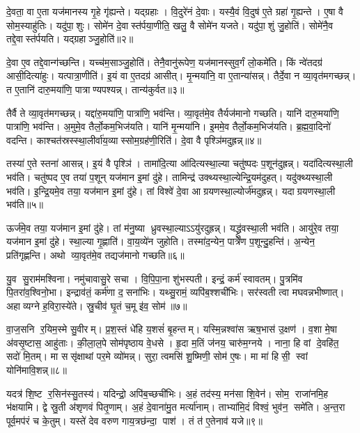 दे॒वता॒ वा ए॒ता यज॑मानस्य गृ॒हे गृ॑ह्यन्ते। यद्ग्रहाः। वि॒दुरे॑नं दे॒वाः। यस्यै॒वं वि॒दुष॑ ए॒ते ग्रहा॑ गृ॒ह्यन्ते। ए॒षा वै सोम॒स्याहु॑तिः। यदु॑पा॒शुः। सोमे॑न दे॒वास्त॑र्पया॒णीति॒ खलु॒ वै सोमे॑न यजते। यदु॑पा॒शुं जु॒होति॑। सोमे॑नै॒व तद्दे॒वास्त॑र्पयति। यद्ग्रहाञ्जु॒होति॑॥२॥

दे॒वा ए॒व तद्दे॒वान्ग॑च्छन्ति। यच्च॑म॒साञ्जु॒होति॑। तेनै॒वानु॑रूपेण॒ यज॑मानस्सुव॒र्गं लो॒कमे॑ति। किं न्वे॑तदग्र॑ आसी॒दित्या॑हुः। यत्पात्रा॒णीति॑। इ॒यं वा ए॒तदग्र॑ आसीत्। मृ॒न्मया॑नि॒ वा ए॒तान्या॑सन्न्। तैर्दे॒वा न व्या॒वृत॑मगच्छन्न्। त ए॒तानि॑ दारु॒मया॑णि॒ पात्राण्यपश्यन्न्। तान्य॑कुर्वत॥३॥

तैर्वै ते व्या॒वृत॑मगच्छन्न्। यद्दा॑रु॒मया॑णि॒ पात्रा॑णि॒ भव॑न्ति। व्या॒वृत॑मे॒व तैर्यज॑मानो गच्छति। यानि॑ दारु॒मया॑णि॒ पात्रा॑णि॒ भव॑न्ति। अ॒मुमे॒व तैर्लो॒कम॒भिज॑यति। यानि॑ मृ॒न्मया॑नि। इ॒ममे॒व तैर्लो॒कम॒भिज॑यति। ब्र॒ह्म॒वा॒दिनो॑ वदन्ति। काश्चत॑स्रस्स्था॒लीर्वा॑य॒व्यास्सोम॒ग्रह॑णी॒रिति॑। दे॒वा वै पृश्ञि॑मदुह्रन्न्॥४॥

तस्या॑ ए॒ते स्तना॑ आसन्न्। इ॒यं वै पृश्ञि॑। तामा॑दि॒त्या आ॑दित्यस्था॒ल्या चतु॑ष्पदः प॒शून॑दुह्रन्न्। यदा॑दित्यस्था॒ली भव॑ति। चतु॑ष्पद ए॒व तया॑ प॒शून् यज॑मान इ॒मां दु॑हे। तामिन्द्र॑ उक्थ्यस्था॒ल्येन्द्रि॒यम॑दुहत्। यदु॑क्थ्यस्था॒ली भव॑ति। इ॒न्द्रि॒यमे॒व तया॒ यज॑मान इ॒मां दु॑हे। तां विश्वे॑ दे॒वा आग्रयणस्था॒ल्योर्ज॑मदुह्रन्न्। यदाग्रयणस्था॒ली भव॑ति॥५॥

ऊर्ज॑मे॒व तया॒ यज॑मान इ॒मां दु॑हे। तां म॑नु॒ष्या ध्रुवस्था॒ल्याऽऽयु॑रदुह्रन्न्। यद्ध्रु॑वस्था॒ली भव॑ति। आयु॑रे॒व तया॒ यज॑मान इ॒मां दु॑हे। स्था॒ल्या गृ॒ह्णाति॑। वा॒य॒व्ये॑न जुहोति। तस्मा॑द॒न्येन॒ पात्रे॑ण प॒शून्दु॒हन्ति॑। अ॒न्येन॒ प्रति॑गृह्णन्ति। अथो व्या॒वृत॑मे॒व तद्यज॑मानो गच्छति॥६॥\anuvakamend[ग्र॒ह॒त्वं ग्रहाञ्जु॒होत्य॑कुर्वतादुह्रन्नाग्रयणस्था॒ली भव॑ति॒ नव॑ च]

यु॒व सु॒राम॑मश्विना। नमु॑चावासु॒रे सचा। वि॒पि॒पा॒ना शु॑भस्पती। इन्द्रं॒ कर्म॑ स्वावतम्। पु॒त्रमि॑व पि॒तरा॑व॒श्विनो॒भा। इन्द्राव॑तं॒ कर्म॑णा द॒सना॑भिः। यथ्सु॒रामं॒ व्यपि॑ब॒श्शची॑भिः। सर॑स्वती त्वा मघवन्नभीष्णात्। अहाव्यग्ने ह॒विरा॒स्ये॑ते। स्रु॒चीव॑ घृ॒तं च॒मू इ॑व॒ सोम॑॥७॥

वा॒ज॒सनि र॒यिम॒स्मे सु॒वीरम्। प्र॒श॒स्तं धे॑हि य॒शसं॑ बृ॒हन्तम्। यस्मि॒न्नश्वा॑स ऋष॒भास॑ उ॒क्षण॑। व॒शा मे॒षा अ॑वसृ॒ष्टास॒ आहु॑ताः। की॒ला॒ल॒पे सोम॑पृष्ठाय वे॒धसे। हृ॒दा म॒तिं ज॑नय॒ चारु॑म॒ग्नये। नाना॒ हि वां दे॒वहि॑त॒ सदो॑ मि॒तम्। मा ससृ॑क्षाथां पर॒मे व्यो॑मन्न्। सुरा॒ त्वमसि॑ शु॒ष्मिणी॒ सोम॑ ए॒षः। मा मा॑ हिसी॒ स्वां योनि॑मावि॒शन्न्॥८॥

यदत्र॑ शि॒ष्ट र॒सिन॑स्सु॒तस्य॑। यदिन्द्रो॒ अपि॑ब॒च्छची॑भिः। अ॒हं तद॑स्य॒ मन॑सा शि॒वेन॑। सोम॒ राजा॑नमि॒ह भ॑क्षयामि। द्वे स्रु॒ती अ॑शृणवं पितृ॒णाम्। अ॒हं दे॒वाना॑मु॒त मर्त्या॑नाम्। ताभ्या॑मि॒दं विश्वं॒ भुव॑न॒ समे॑ति। अ॒न्त॒रा पूर्व॒मप॑रं च के॒तुम्। यस्ते॑ देव वरुण गाय॒त्रछ॑न्दा॒ पाश॑। तं त॑ ए॒तेनाव॑ यजे॥९॥

